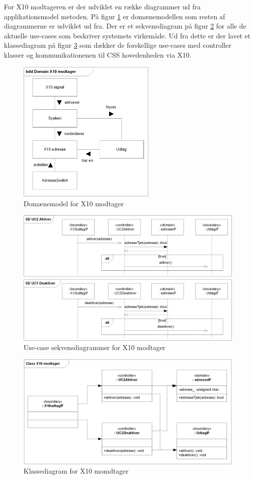 For X10 modtageren er der udviklet en række diagrammer ud fra applikationsmodel metoden.
På figur \ref{fig:X10_modtager_domain} er domænemodellen som resten af diagrammerne er udviklet ud fra.
Der er et sekvensdiagram på figur \ref{fig:X10_modtager_SD} for alle de aktuelle use-cases som beskriver systemets virkemåde.
Ud fra dette er der lavet et klassediagram på figur \ref{fig:X10_modtager_Class} som dækker de forskellige use-cases med controller klasser og kommunikationenen til CSS hovedenheden via X10.


\begin{figure}[!htb] \centering
\centering \includegraphics[width=0.6\textwidth]{billeder/uml/X10_modtager_Domain}
     \caption{Domænemodel for X10 modtager}
     \label{fig:X10_modtager_domain}
\end{figure}

\begin{figure}[!htb]
	\includegraphics[width=\textwidth]{billeder/uml/X10_modtager_SD}
     \caption{Use-case sekvensdiagrammer for X10 modtager}
     \label{fig:X10_modtager_SD}
\end{figure}

\begin{figure}[!htb]
     \includegraphics[width=\textwidth]{billeder/uml/X10_modtager_Class}
     \caption{Klassediagram for X10 momdtager}
     \label{fig:X10_modtager_Class}
\end{figure}
